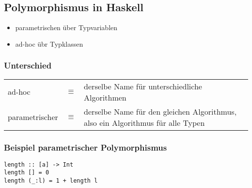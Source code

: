 
	\subsection{Polymorphismus in Haskell} %
	\label{sub:polymorphismus_in_haskell}
		\begin{itemize}
			\item parametrischen über Typvariablen
			\item ad-hoc übr Typklassen
		\end{itemize}

		\subsubsection*{Unterschied} %
		\label{ssub:unterschied}
			\begin{tabular}{lcp{8cm}}
				ad-hoc & $\equiv$ & derselbe Name für unterschiedliche Algorithmen\\
				parametrischer & $\equiv$ & derselbe Name für den gleichen Algorithmus, also ein Algorithmus für alle Typen
			\end{tabular}

		\subsubsection*{Beispiel parametrischer Polymorphismus} %
		\label{ssub:beispiel_parametrischer_polymorphismus}
			\lstHaskell
			\begin{lstlisting}
length :: [a] -> Int
length [] = 0
length (_:l) = 1 + length l
			\end{lstlisting}

